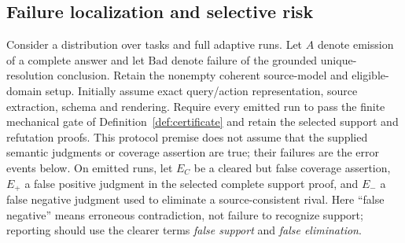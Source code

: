 \subsection{Failure localization and selective risk}

Consider a distribution over tasks and full adaptive runs. Let $A$ denote
emission of a complete answer and let $\mathrm{Bad}$ denote failure of the
grounded unique-resolution conclusion. Retain the nonempty coherent source-model
and eligible-domain setup. Initially assume exact query/action representation,
source extraction, schema and rendering. Require every emitted run to pass the
finite mechanical gate of Definition~\ref{def:certificate} and retain the
selected support and refutation proofs. This protocol premise does not assume
that the supplied semantic judgments or coverage assertion are true; their
failures are the error events below. On emitted runs,
let $E_C$ be a cleared but false coverage assertion, $E_+$ a false positive
judgment in the selected complete support proof, and $E_-$ a false negative
judgment used to eliminate a source-consistent rival. Here ``false negative''
means erroneous contradiction, not failure to recognize support; reporting
should use the clearer terms \emph{false support} and \emph{false elimination}.

